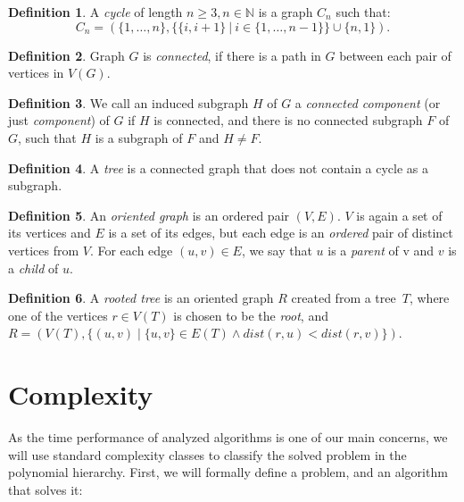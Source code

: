 \documentclass[thesis=M,english,hidelinks]{FITthesis}[2012/10/20]
\theoremstyle{definition}
\newtheorem{definition}{Definition}
\begin{document}
\begin{definition}
    A \emph{cycle} of length $n \geq 3, n \in \mathbb{N}$ is a graph $C_n$ such that:
    $$
    C_n = (\{1, \ldots, n\}, \{\{i, i+1\}\ |\ i \in \{1, \ldots, n-1\}\} \cup \{n, 1\}).
    $$
\end{definition}

\begin{definition}
    Graph $G$ is \emph{connected}, if there is a path in $G$ between each pair of vertices in $V(G)$.
\end{definition}

\begin{definition}
    We call an induced subgraph $H$ of $G$ a \emph{connected component} (or just \emph{component}) of $G$ if $H$ is
    connected, and there is no connected subgraph $F$ of $G$, such that $H$ is a subgraph of $F$ and $H \neq F$.
\end{definition}

\begin{definition}
    A \emph{tree} is a connected graph that does not contain a cycle as a subgraph.
\end{definition}

\begin{definition}
    An \emph{oriented graph} is an ordered pair $(V, E)$. $V$ is again a set of its vertices and $E$ is a set of
    its edges, but each edge is an \emph{ordered} pair of distinct vertices from $V$. For each edge $(u, v) \in E$, we
    say that $u$ is a \emph{parent} of v and $v$ is a \emph{child} of $u$.
\end{definition}

\begin{definition}
    A \emph{rooted tree} is an oriented graph $R$ created from a tree~$T$, where one of the vertices $r \in V(T)$ is
    chosen to be the \emph{root}, and $R = (V(T), \{(u, v) \mid \{u, v\} \in E(T) \land dist(r, u) < dist(r, v)\})$.
\end{definition}

\section{Complexity}
\label{sec:complexity}

As the time performance of analyzed algorithms is one of our main concerns, we will use standard complexity classes to
classify the solved problem in the polynomial hierarchy. First, we will formally define a problem, and an algorithm that
solves it:
\end{document}
